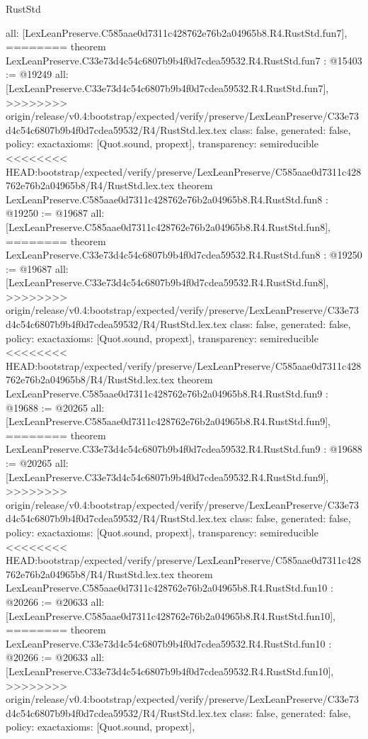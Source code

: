 \begin{lexlean}{RustStd}
\begin{coremodule}
{\begin{coremodule}
{{{{{{{{{{  all: [LexLeanPreserve.C585aae0d7311c428762e76b2a04965b8.R4.RustStd.fun7],
========
theorem LexLeanPreserve.C33e73d4c54c6807b9b4f0d7cdea59532.R4.RustStd.fun7 : @15403 := @19249 {
  all: [LexLeanPreserve.C33e73d4c54c6807b9b4f0d7cdea59532.R4.RustStd.fun7],
>>>>>>>> origin/release/v0.4:bootstrap/expected/verify/preserve/LexLeanPreserve/C33e73d4c54c6807b9b4f0d7cdea59532/R4/RustStd.lex.tex
  class: false,
  generated: false,
  policy: exact{axioms: [Quot.sound, propext]},
  transparency: semireducible
}
<<<<<<<< HEAD:bootstrap/expected/verify/preserve/LexLeanPreserve/C585aae0d7311c428762e76b2a04965b8/R4/RustStd.lex.tex
theorem LexLeanPreserve.C585aae0d7311c428762e76b2a04965b8.R4.RustStd.fun8 : @19250 := @19687 {
  all: [LexLeanPreserve.C585aae0d7311c428762e76b2a04965b8.R4.RustStd.fun8],
========
theorem LexLeanPreserve.C33e73d4c54c6807b9b4f0d7cdea59532.R4.RustStd.fun8 : @19250 := @19687 {
  all: [LexLeanPreserve.C33e73d4c54c6807b9b4f0d7cdea59532.R4.RustStd.fun8],
>>>>>>>> origin/release/v0.4:bootstrap/expected/verify/preserve/LexLeanPreserve/C33e73d4c54c6807b9b4f0d7cdea59532/R4/RustStd.lex.tex
  class: false,
  generated: false,
  policy: exact{axioms: [Quot.sound, propext]},
  transparency: semireducible
}
<<<<<<<< HEAD:bootstrap/expected/verify/preserve/LexLeanPreserve/C585aae0d7311c428762e76b2a04965b8/R4/RustStd.lex.tex
theorem LexLeanPreserve.C585aae0d7311c428762e76b2a04965b8.R4.RustStd.fun9 : @19688 := @20265 {
  all: [LexLeanPreserve.C585aae0d7311c428762e76b2a04965b8.R4.RustStd.fun9],
========
theorem LexLeanPreserve.C33e73d4c54c6807b9b4f0d7cdea59532.R4.RustStd.fun9 : @19688 := @20265 {
  all: [LexLeanPreserve.C33e73d4c54c6807b9b4f0d7cdea59532.R4.RustStd.fun9],
>>>>>>>> origin/release/v0.4:bootstrap/expected/verify/preserve/LexLeanPreserve/C33e73d4c54c6807b9b4f0d7cdea59532/R4/RustStd.lex.tex
  class: false,
  generated: false,
  policy: exact{axioms: [Quot.sound, propext]},
  transparency: semireducible
}
<<<<<<<< HEAD:bootstrap/expected/verify/preserve/LexLeanPreserve/C585aae0d7311c428762e76b2a04965b8/R4/RustStd.lex.tex
theorem LexLeanPreserve.C585aae0d7311c428762e76b2a04965b8.R4.RustStd.fun10 : @20266 := @20633 {
  all: [LexLeanPreserve.C585aae0d7311c428762e76b2a04965b8.R4.RustStd.fun10],
========
theorem LexLeanPreserve.C33e73d4c54c6807b9b4f0d7cdea59532.R4.RustStd.fun10 : @20266 := @20633 {
  all: [LexLeanPreserve.C33e73d4c54c6807b9b4f0d7cdea59532.R4.RustStd.fun10],
>>>>>>>> origin/release/v0.4:bootstrap/expected/verify/preserve/LexLeanPreserve/C33e73d4c54c6807b9b4f0d7cdea59532/R4/RustStd.lex.tex
  class: false,
  generated: false,
  policy: exact{axioms: [Quot.sound, propext]},
}}}}}}}}}}}}}}
\end{coremodule}}
\end{coremodule}
\end{lexlean}

